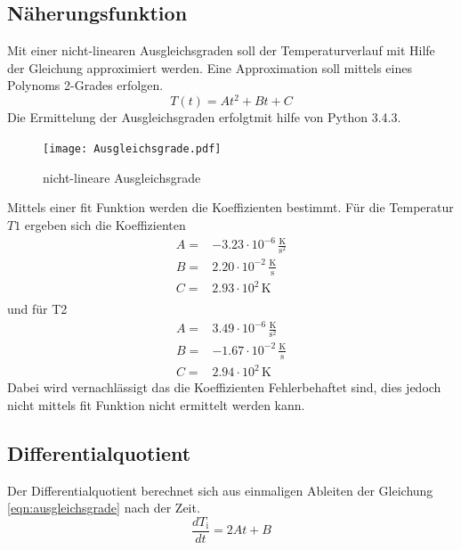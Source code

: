 \subsection{Näherungsfunktion}
Mit einer nicht-linearen Ausgleichsgraden soll der Temperaturverlauf mit Hilfe der Gleichung approximiert werden. Eine Approximation soll mittels eines Polynoms 2-Grades erfolgen.
\begin{equation}
  T(t) = At^2 + Bt +C
  \label{eqn:ausgleichsgrade}
\end{equation}
Die Ermittelung der Ausgleichsgraden erfolgtmit hilfe von Python 3.4.3.
\begin{figure}
  \centering
  \texttt{[image: Ausgleichsgrade.pdf]}
  \caption{nicht-lineare Ausgleichsgrade}
  \label{fig:ausg}
\end{figure}
Mittels einer fit Funktion werden die Koeffizienten bestimmt. Für die Temperatur $T1$ ergeben sich die Koeffizienten 
\begin{eqnarray}
  A =& -3.23 \cdot 10^{-6} \, \frac{\text{K}}{\text{s}^2}	\\ 
  B =& 2.20 \cdot 10^{-2} \, \frac{\text{K}}{\text{s}} 	\\
  C =& 2.93 \cdot 10^{2} \, \text{K} \\
  \label{eqn:koefT1}
\end{eqnarray}
und für T2 
\begin{eqnarray}
  A =& 3.49 \cdot 10^{-6} \, \frac{\text{K}}{\text{s}^2} 	\\
  B =& -1.67 \cdot 10^{-2} \, \frac{\text{K}}{\text{s}} 	\\
  C =& 2.94 \cdot 10^2 \, \text{K}
  \label{eqn:koefT2}
\end{eqnarray}
Dabei wird vernachlässigt das die Koeffizienten Fehlerbehaftet sind, dies jedoch nicht mittels fit Funktion nicht ermittelt werden kann.
\subsection{Differentialquotient}
Der Differentialquotient berechnet sich aus einmaligen Ableiten der Gleichung \ref{eqn:ausgleichsgrade} nach der Zeit.
\begin{equation}
  \frac{dT_{\text{i}}}{dt} = 2At + B
  \label{eqn:diffq}
\end{equation}
